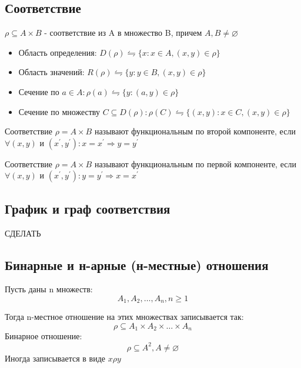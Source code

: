\documentclass{report}
\begin{document}
\subsection{Соответствие}
$\rho \subseteq A \times B$ - соответствие из A в множество B, причем $A,B \neq \varnothing$


\begin{itemize}
	\item Область определения: $D(\rho) \leftrightharpoons \{x:x \in A, (x,y) \in \rho\}$
	\item Область значений: $R(\rho) \leftrightharpoons \{y:y \in B, (x,y) \in \rho\}$
	\item Сечение по $a \in A: \rho(a) \leftrightharpoons \{y: (a,y) \in \rho\}$
	\item Сечение по множеству $C \subseteq D(\rho): \rho(C) \leftrightharpoons \{(x,y):x \in C, (x,y) \in \rho\}$
\end{itemize}

Соответствие $\rho = A \times B$ называют функциональным по второй компоненте,
если $\forall (x,y)$ и $(x^\prime, y^\prime): x = x^\prime \Rightarrow y = y^\prime$

\medskip

Соответствие $\rho = A \times B$ называют функциональным по первой компоненте,
если $\forall (x,y)$ и $(x^\prime, y^\prime): y = y^\prime \Rightarrow x = x^\prime$

\subsection{График и граф соответствия}
СДЕЛАТЬ

\subsection{Бинарные и н-арные (н-местные) отношения}

Пусть даны n множеств:
\[
A_1,A_2, \ldots, A_{n}, n\ge 1
\] 

Тогда n-местное отношение на этих множествах записывается так:
\[
\rho \subseteq A_1 \times A_2 \times \ldots \times A_{n}
\] 
Бинарное отношение:
\[
	\rho \subseteq A^2, A \neq \varnothing
\] 
Иногда записывается в виде $x\rho y$

\medskip
\end{document}
